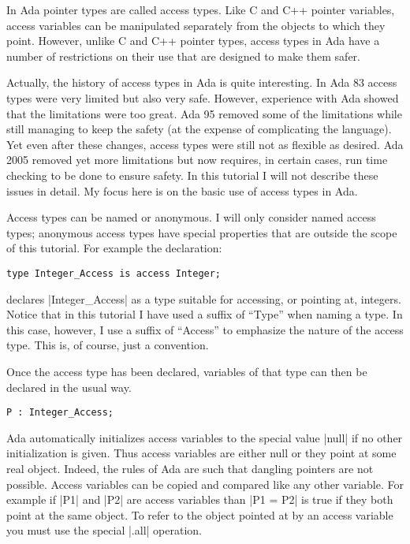 In Ada pointer types are called access types. Like C and C++ pointer variables, access variables
can be manipulated separately from the objects to which they point. However, unlike C and C++
pointer types, access types in Ada have a number of restrictions on their use that are designed
to make them safer.

Actually, the history of access types in Ada is quite interesting. In Ada 83 access types were
very limited but also very safe. However, experience with Ada showed that the limitations were
too great. Ada 95 removed some of the limitations while still managing to keep the safety (at
the expense of complicating the language). Yet even after these changes, access types were still
not as flexible as desired. Ada 2005 removed yet more limitations but now requires, in certain
cases, run time checking to be done to ensure safety. In this tutorial I will not describe
these issues in detail. My focus here is on the basic use of access types in Ada.

Access types can be named or anonymous. I will only consider named access types; anonymous
access types have special properties that are outside the scope of this tutorial. For example
the declaration:

\begin{lstlisting}
type Integer_Access is access Integer;
\end{lstlisting}

declares |Integer_Access| as a type suitable for accessing, or pointing at, integers. Notice
that in this tutorial I have used a suffix of ``Type'' when naming a type. In this case,
however, I use a suffix of ``Access'' to emphasize the nature of the access type. This is, of
course, just a convention.

Once the access type has been declared, variables of that type can then be declared in the usual
way.

\begin{lstlisting}
P : Integer_Access;
\end{lstlisting}

Ada automatically initializes access variables to the special value |null| if no other
initialization is given. Thus access variables are either null or they point at some real
object. Indeed, the rules of Ada are such that dangling pointers are not possible. Access
variables can be copied and compared like any other variable. For example if |P1| and |P2| are
access variables than |P1 = P2| is true if they both point at the same object. To refer to the
object pointed at by an access variable you must use the special |.all| operation.

